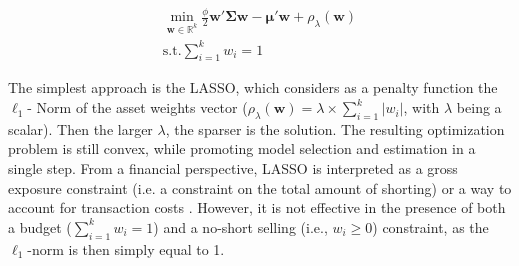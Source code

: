 \documentclass[12pt, a4paper]{article}
\newcommand{\bfw}{\boldsymbol{w} }
\newcommand{\bfmu}{\boldsymbol{\mu} }
\newcommand{\bfSigma}{\boldsymbol{\Sigma} }
\begin{document}
%
\begin{gather}\label{eq:minreg}
\min_{\bfw \in \mathbb{R}^k} \frac{\phi}{2} \bfw'\bfSigma \bfw - \bfmu'\bfw + \rho_{\lambda}(\bfw) \\
\text{s.t.} \sum_{i=1}^k w_i = 1
\end{gather}
%

\noindent
The simplest approach is the LASSO, which considers as a penalty function the $\ell_1$- Norm of the asset weights vector ($\rho_{\lambda}(\bfw)= \lambda \times \sum_{i=1}^{k} |w_i|$, with $\lambda$ being a scalar). Then the larger $\lambda$, the sparser is the solution. The resulting optimization problem is still convex, while promoting model selection and estimation in a single step. %
From a financial perspective, LASSO is interpreted as a gross exposure constraint (i.e. a constraint on the total amount of shorting) or a way to account for transaction costs \citep{Brodie2009}. However, it is not effective in the presence of both a budget ($\sum_{i=1}^{k} w_{i} = 1$) and a no-short selling (i.e., $w_i \geq 0$) constraint, as the $\ell_1$-norm is then simply equal to 1.
\end{document}
